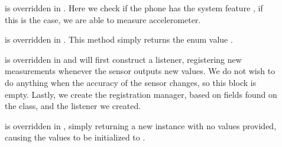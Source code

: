 \begin{description}
  \item[] is overridden in . Here we check if the phone has the system feature , if this is the case, we are able to measure accelerometer.

  \item[] is overridden in . This method simply returns the enum value .

  \item[] is overridden in  and will first construct a listener, registering new measurements whenever the sensor outputs new values. We do not wish to do anything when the accuracy of the sensor changes, so this block is empty. Lastly, we create the registration manager, based on fields found on the  class, and the listener we created.

  \item[] is overridden in , simply returning a new  instance with no values provided, causing the values to be initialized to .
\end{description}


\FloatBarrier

